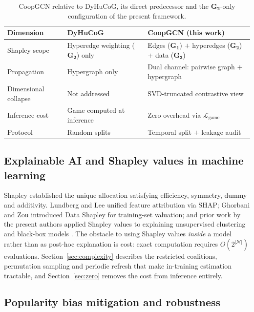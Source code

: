 \documentclass[final,5p,times,twocolumn]{elsarticle}
\begin{document}
\begin{table}[t]
\centering
\caption{CoopGCN relative to DyHuCoG, its direct predecessor and the
$\mathbf{G_2}$-only configuration of the present framework.}
\label{tab:vsdyhucog}
\footnotesize
\begin{tabular}{p{1.35cm}p{2.35cm}p{3.05cm}}
\toprule
\textbf{Dimension} & \textbf{DyHuCoG} & \textbf{CoopGCN (this work)} \\
\midrule
Shapley scope & Hyperedge weighting ($\mathbf{G_2}$) only & Edges
($\mathbf{G_1}$) $+$ hyperedges ($\mathbf{G_2}$) $+$ data ($\mathbf{G_3}$) \\
Propagation & Hypergraph only & Dual channel: pairwise graph $+$ hypergraph \\
Dimensional collapse & Not addressed & SVD-truncated contrastive view \\
Inference cost & Game computed at inference & Zero overhead via
$\mathcal{L}_{\mathrm{game}}$ \\
Protocol & Random splits & Temporal split $+$ leakage audit \\
\bottomrule
\end{tabular}
\end{table}

\subsection{Explainable AI and Shapley values in machine learning}
\label{sec:rw-xai}

Shapley \citep{shapley1953value} established the unique allocation satisfying
efficiency, symmetry, dummy and additivity. Lundberg and Lee
\citep{lundberg2017shap} unified feature attribution via SHAP; Ghorbani and
Zou \citep{ghorbani2019datashapley} introduced Data Shapley for training-set
valuation; and prior work by the present authors applied Shapley values to
explaining unsupervised clustering and black-box models
\citep{louhichi2023shapley}. The obstacle to using Shapley values \emph{inside}
a model rather than as post-hoc explanation is cost: exact computation
requires $O(2^{|\mathcal{N}|})$ evaluations. Section~\ref{sec:complexity}
describes the restricted coalitions, permutation sampling and periodic refresh
that make in-training estimation tractable, and Section~\ref{sec:zero} removes
the cost from inference entirely.

\subsection{Popularity bias mitigation and robustness}
\label{sec:rw-bias}
\end{document}
